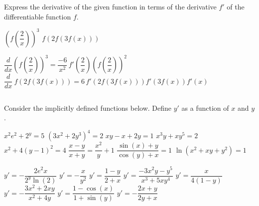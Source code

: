 \begin{Exercise} Express the derivative of the given function in terms of the derivative $f'$ of the differentiable function $f$. 
\begin{multicols}{2}
    \Question[difficulty = 2] $\left(f\left(\dfrac{2}{x}\right)\right)^3$
    \Question[difficulty = 2] $f\left(2f(3f(x))\right)$
    \EndCurrentQuestion
\end{multicols}

\end{Exercise}

\begin{Answer}\phantom{}
    
    \Question $\dfrac{d}{dx}\left(f\left(\dfrac{2}{x}\right)\right)^3=  \dfrac{-6}{x^2}\, f'\left(\dfrac{2}{x}\right) \left( f \left(\dfrac{2}{x}\right)\right)^2$
    \Question $\dfrac{d}{dx} \ f\left(2f(3f(x))\right)= 6\, f'\left(2f(3f(x))\right)f'(3f(x))f'(x)$
    
\end{Answer}

\fi

\ifanalysis \pagebreak \fi
\subsection*{}
\begin{Exercise} Consider the implicitly defined functions below. Define $y'$ as a function of $x$ and $y$. 
	\begin{multicols}{2}
	\Question[difficulty = 1] $ x^2 e^2 + 2^y=5$
	\Question[difficulty = 1] $ \left(3x^2+2y^3 \right)^4 = 2$
	\Question[difficulty = 1] $xy - x + 2y = 1$
	\Question[difficulty = 1] $x^3y+xy^5 = 2$
	\Question[difficulty = 1] $x^2 + 4(y-1)^2=4$
	\Question[difficulty = 2] $\dfrac{x-y}{x+y} = \dfrac{x^2}{y} +1$
	\Question[difficulty = 2] $ \dfrac{\sin(x)+y}{\cos(y) + x} = 1$
	\ifanalysis\Question[difficulty = 1]\fi\ifcalculus\Question[difficulty = 2]\fi $ \ln \left( x^2+xy+y^2 \right) = 1$
	\EndCurrentQuestion
	\end{multicols}
	
\end{Exercise}

\begin{Answer}\phantom{}
    \begin{multicols}{2}
		
    	\Question $y' = - \dfrac{2e^2x}{2^y \ln(2)} $
    	\Question $y' = - \dfrac{x}{y^2} $ 
		\Question $y' = \dfrac{1-y}{2 + x}$
		\Question $y' = \dfrac{-3x^2y - y^5}{x^3 + 5xy^4}$
		\Question $y' = \dfrac{x}{4(1-y)}$
		\Question $y' = -\dfrac{3x^2 +2xy }{x^2 + 4y}$
    	\Question $y' = \dfrac{1-\cos(x)}{1+\sin(y)}$ 
    	\Question $y' = - \dfrac{2x+y}{2y+x} $
		\EndCurrentQuestion
	\end{multicols}
\end{Answer}

